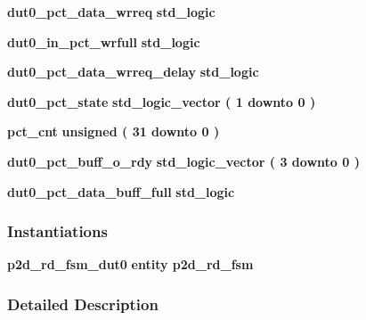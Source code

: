 \begin{DoxyCompactItemize}
\item 
{\bf dut0\+\_\+pct\+\_\+data\+\_\+wrreq} {\bfseries \textcolor{comment}{std\+\_\+logic}\textcolor{vhdlchar}{ }} 
\item 
{\bf dut0\+\_\+in\+\_\+pct\+\_\+wrfull} {\bfseries \textcolor{comment}{std\+\_\+logic}\textcolor{vhdlchar}{ }} 
\item 
{\bf dut0\+\_\+pct\+\_\+data\+\_\+wrreq\+\_\+delay} {\bfseries \textcolor{comment}{std\+\_\+logic}\textcolor{vhdlchar}{ }} 
\item 
{\bf dut0\+\_\+pct\+\_\+state} {\bfseries \textcolor{comment}{std\+\_\+logic\+\_\+vector}\textcolor{vhdlchar}{ }\textcolor{vhdlchar}{(}\textcolor{vhdlchar}{ }\textcolor{vhdlchar}{ } \textcolor{vhdldigit}{1} \textcolor{vhdlchar}{ }\textcolor{keywordflow}{downto}\textcolor{vhdlchar}{ }\textcolor{vhdlchar}{ } \textcolor{vhdldigit}{0} \textcolor{vhdlchar}{ }\textcolor{vhdlchar}{)}\textcolor{vhdlchar}{ }} 
\item 
{\bf pct\+\_\+cnt} {\bfseries \textcolor{comment}{unsigned}\textcolor{vhdlchar}{ }\textcolor{vhdlchar}{(}\textcolor{vhdlchar}{ }\textcolor{vhdlchar}{ } \textcolor{vhdldigit}{31} \textcolor{vhdlchar}{ }\textcolor{keywordflow}{downto}\textcolor{vhdlchar}{ }\textcolor{vhdlchar}{ } \textcolor{vhdldigit}{0} \textcolor{vhdlchar}{ }\textcolor{vhdlchar}{)}\textcolor{vhdlchar}{ }} 
\item 
{\bf dut0\+\_\+pct\+\_\+buff\+\_\+o\+\_\+rdy} {\bfseries \textcolor{comment}{std\+\_\+logic\+\_\+vector}\textcolor{vhdlchar}{ }\textcolor{vhdlchar}{(}\textcolor{vhdlchar}{ }\textcolor{vhdlchar}{ } \textcolor{vhdldigit}{3} \textcolor{vhdlchar}{ }\textcolor{keywordflow}{downto}\textcolor{vhdlchar}{ }\textcolor{vhdlchar}{ } \textcolor{vhdldigit}{0} \textcolor{vhdlchar}{ }\textcolor{vhdlchar}{)}\textcolor{vhdlchar}{ }} 
\item 
{\bf dut0\+\_\+pct\+\_\+data\+\_\+buff\+\_\+full} {\bfseries \textcolor{comment}{std\+\_\+logic}\textcolor{vhdlchar}{ }} 
\end{DoxyCompactItemize}
\subsubsection*{Instantiations}
 \begin{DoxyCompactItemize}
\item 
{\bf p2d\+\_\+rd\+\_\+fsm\+\_\+dut0}  {\bfseries entity p2d\+\_\+rd\+\_\+fsm}   
\end{DoxyCompactItemize}


\subsubsection{Detailed Description}


